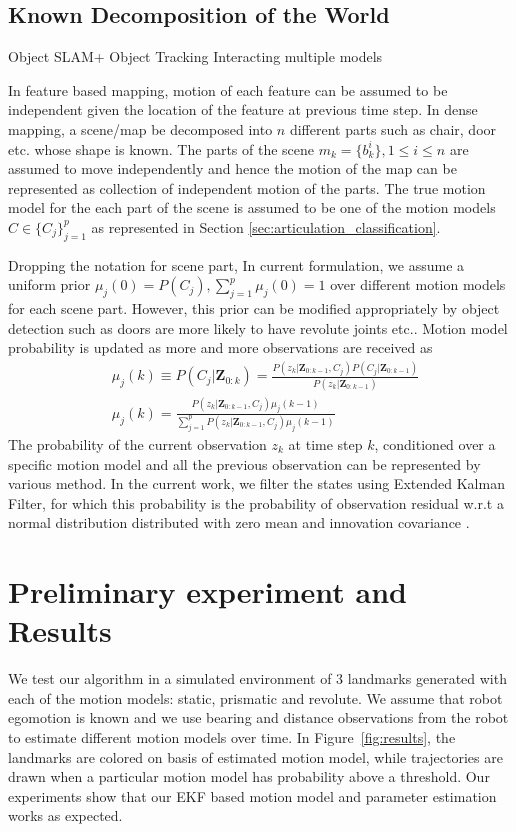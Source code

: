 \documentclass[10pt,twocolumn,letterpaper]{article}
\begin{document}
\subsection{Known Decomposition of the World} Object SLAM+ Object Tracking Interacting multiple models

In feature based mapping, motion of each feature can be assumed to be independent given the location of the feature at previous time step. In dense mapping, a scene/map be decomposed into $n$ different parts such as chair, door etc. whose shape is known. The parts of the scene $m_k = \{b^i_k\},  1\leq i \leq n$ are assumed to move independently and hence the motion of the map can be represented as collection of independent motion of the parts. The true motion model for the  each part of the scene is assumed to be one of the motion models $C \in \{C_j\}^{p}_{j=1}$ as represented in Section \ref{sec:articulation_classification}. 

Dropping the notation for scene part, In current formulation, we assume a uniform prior $\mu_j(0) = P(C_j), \sum_{j=1}^{p}\mu_j(0) = 1$ over different motion models for each scene part. However, this prior can be modified appropriately by object detection such as doors are more likely to have revolute joints etc.. Motion model probability is updated as more and more observations are received \cite{yaakov2001estimation} as 
\begin{align}
& \mu_j(k) \equiv P(C_j|\mathbf{Z}_{0:k})  = 
\frac{P(z_k|\mathbf{Z}_{0:k-1}, C_j)P(C_j|\mathbf{Z}_{0:k-1})}{P(z_k|\mathbf{Z}_{0:k-1})} \nonumber \\
&\mu_j(k) = \frac{P(z_k|\mathbf{Z}_{0:k-1}, C_j)\mu_j(k-1)}{\sum_{j=1}^{p} P(z_k|\mathbf{Z}_{0:k-1}, C_j)\mu_j(k-1) }
\end{align}
The probability of the current observation $z_k$ at time step $k$, conditioned over a specific motion model and all the previous observation can be represented by various method. In the current work, we filter the states using Extended Kalman Filter, for which this probability is the probability of observation residual w.r.t a normal distribution distributed with zero mean and innovation covariance \cite{yaakov2001estimation}.


\section{Preliminary experiment and Results}
We test our algorithm in a simulated environment of 3 landmarks generated with each of the motion models: static, prismatic and revolute. We assume that robot egomotion is known and we use bearing and distance observations from the robot to estimate different motion models over time. In Figure~\ref{fig:results}, the landmarks are colored on basis of estimated motion model, while trajectories are drawn when a particular motion model has probability above a threshold. Our experiments show that our EKF based motion model and parameter estimation works as expected.
\end{document}
